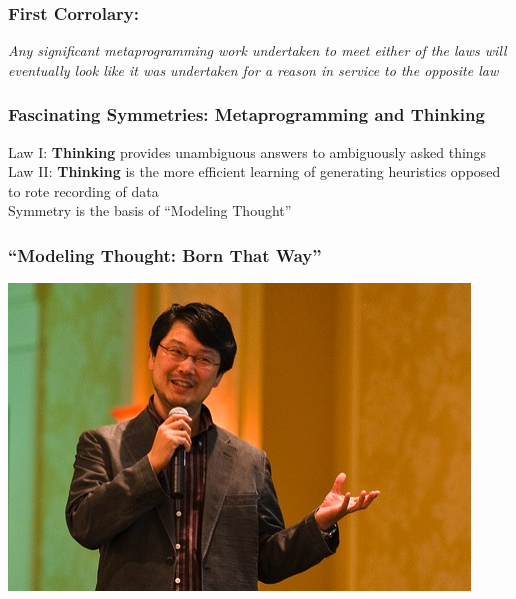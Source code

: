 \documentclass[slidestop,compress,mathserif]{beamer}
\begin{document}
\begin{frame}
	\frametitle{First Corrolary:}
	\begin{center}
		\emph{Any significant metaprogramming work undertaken to meet either of
    the laws will eventually look like it was undertaken for a reason in
    service to the opposite law}
	\end{center}
\end{frame}

\begin{frame}
	\frametitle{Fascinating Symmetries:  Metaprogramming and Thinking}
	Law I:  \textbf{Thinking} provides unambiguous answers to ambiguously asked things \\
	Law II: \textbf{Thinking} is the more efficient learning of generating heuristics opposed to rote recording of data \\
	\vskip 0.5cm
	Symmetry is the basis of ``Modeling Thought''
\end{frame}

\begin{frame}
	\frametitle{``Modeling Thought: Born That Way''}
	\includegraphics[scale=0.6]{img/matz.jpg}		
\end{frame}

\end{document}
